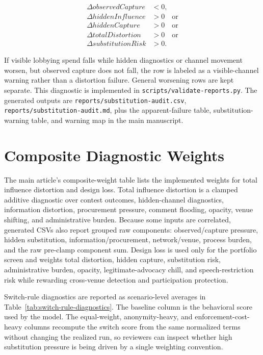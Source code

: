 \begin{align*}
\Delta observedCapture &< 0,\\
\Delta hiddenInfluence &> 0 \quad \text{or}\\
\Delta hiddenCapture &> 0 \quad \text{or}\\
\Delta totalDistortion &> 0 \quad \text{or}\\
\Delta substitutionRisk &> 0.
\end{align*}

If visible lobbying spend falls while hidden diagnostics or channel movement worsen, but observed capture does not fall, the row is labeled as a visible-channel warning rather than a distortion failure. General worsening rows are kept separate. This diagnostic is implemented in \texttt{scripts/validate-reports.py}. The generated outputs are \texttt{reports/substitution-audit.csv}, \texttt{reports/substitution-audit.md}, plus the apparent-failure table, substitution-warning table, and warning map in the main manuscript.

\section{Composite Diagnostic Weights}

The main article's composite-weight table lists the implemented weights for total influence distortion and design loss. Total influence distortion is a clamped additive diagnostic over contest outcomes, hidden-channel diagnostics, information distortion, procurement pressure, comment flooding, opacity, venue shifting, and administrative burden. Because some inputs are correlated, generated CSVs also report grouped raw components: observed/capture pressure, hidden substitution, information/procurement, network/venue, process burden, and the raw pre-clamp component sum. Design loss is used only for the portfolio screen and weights total distortion, hidden capture, substitution risk, administrative burden, opacity, legitimate-advocacy chill, and speech-restriction risk while rewarding cross-venue detection and participation protection.

Switch-rule diagnostics are reported as scenario-level averages in Table~\ref{tab:switch-rule-diagnostics}. The baseline column is the behavioral score used by the model. The equal-weight, anonymity-heavy, and enforcement-cost-heavy columns recompute the switch score from the same normalized terms without changing the realized run, so reviewers can inspect whether high substitution pressure is being driven by a single weighting convention.

